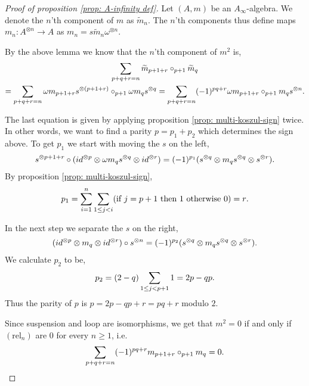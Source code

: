 \documentclass[../thesis.tex]{subfiles}
\begin{document}
        \begin{proof}[Proof of proposition \ref{prop: A-infinity def}]
            Let $(A,m)$ be an $A_\infty$-algebra. We denote the $n$'th component of $m$ as $\widetilde{m}_n$. The $n$'th components thus define maps $m_n:A^{\otimes n}\rightarrow A$ as $m_n = s\widetilde{m}_n \omega^{\otimes n}$.

            By the above lemma we know that the $n$'th component of $m^2$ is,
            \begin{multline*}
                \sum_{p + q + r = n}\widetilde{m}_{p+1+r}\circ_{p+1}\widetilde{m}_q \\
                = \sum_{p + q + r = n}\omega m_{p+1+r}s^{\otimes (p+1+r)}\circ_{p+1}\omega m_qs^{\otimes q} = \sum_{p + q + r = n}(-1)^{pq+r}\omega m_{p+1+r}\circ_{p+1}m_q s^{\otimes n}\tt{.}
            \end{multline*}

            The last equation is given by applying proposition \ref{prop: multi-koszul-sign} twice. In other words, we want to find a parity $p = p_1 + p_2$ which determines the sign above. To get $p_1$ we start with moving the $s$ on the left,
            \begin{align*}
                s^{\otimes p + 1 + r} \circ (id^{\otimes p} \otimes \omega m_q s^{\otimes q} \otimes id^{\otimes r}) = (-1)^{p_1}(s^{\otimes q} \otimes m_q s^{\otimes q} \otimes s^{\otimes r})\tt{.}
            \end{align*}
            By proposition \ref{prop: multi-koszul-sign},
            \begin{align*}
                p_1 = \sum_{i=1}^n\sum_{1\leq j < i}(\tt{if }j = p+1\tt{ then }1\tt{ otherwise }0) = r\tt{.}
            \end{align*}

            In the next step we separate the $s$ on the right,
            \begin{align*}
                (id^{\otimes p}\otimes m_q \otimes id^{\otimes r}) \circ s^{\otimes n} = (-1)^{p_2}(s^{\otimes q}\otimes m_qs^{\otimes q}\otimes s^{\otimes r})\tt{.}
            \end{align*}
            We calculate $p_2$ to be,
            \begin{align*}
                p_2 = (2-q)\sum_{1\leq j < p+1}1 = 2p - qp\tt{.}
            \end{align*}
            Thus the parity of $p$ is $p = 2p - qp + r = pq + r$ modulo $2$.

            Since suspension and loop are isomorphisms, we get that $m^2 = 0$ if and only if $(\text{rel}_n)$ are $0$ for every $n\geq 1$, i.e.
            \begin{align*}
                \sum_{p+q+r = n} (-1)^{pq+r} m_{p+1+r} \circ_{p+1} m_q = 0\tt{.}
            \end{align*}
        \end{proof}
\end{document}
